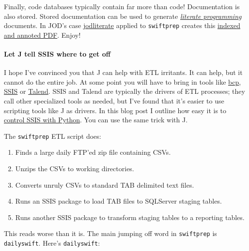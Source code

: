     Finally, code databases typically contain far more than code!
Documentation is also stored. Stored documentation can be used to
generate
\href{https://en.wikipedia.org/wiki/Literate_programming}{\emph{literate
programming}} documents. In JOD's case
\href{https://analyzethedatanotthedrivel.org/2020/05/25/using-jodliterate/}{jodliterate}
applied to \texttt{swiftprep} creates this
\href{https://bakerjd99.files.wordpress.com/2021/08/swiftprep.pdf}{indexed
and annoted PDF}. Enjoy!

    \hypertarget{let-j-tell-ssis-where-to-get-off}{%
\paragraph{Let J tell SSIS where to get
off}\label{let-j-tell-ssis-where-to-get-off}}

I hope I've convinced you that J can help with ETL irritants. It can
help, but it cannot do the entire job. At some point you will have to
bring in tools like
\href{https://docs.microsoft.com/en-us/sql/tools/bcp-utility?view=sql-server-ver15}{bcp},
\href{https://docs.microsoft.com/en-us/sql/integration-services/sql-server-integration-services?view=sql-server-ver15}{SSIS}
or \href{https://www.talend.com/}{Talend}. SSIS and Talend are typically
the drivers of ETL processes; they call other specialized tools as
needed, but I've found that it's easier to use scripting tools like J as
drivers. In this blog post I outline how easy it is to
\href{https://analyzethedatanotthedrivel.org/2021/06/05/running-ssis-packages-with-python/}{control
SSIS with Python}. You can use the same trick with J.

    The \texttt{swiftprep} ETL script does:

\begin{enumerate}
\def\labelenumi{\arabic{enumi}.}
\tightlist
\item
  Finds a large daily FTP'ed zip file containing CSVs.
\item
  Unzips the CSVs to working directories.
\item
  Converts unruly CSVs to standard TAB delimited text files.
\item
  Runs an SSIS package to load TAB files to SQLServer staging tables.
\item
  Runs another SSIS package to transform staging tables to a reporting
  tables.
\end{enumerate}

    This reads worse than it is. The main jumping off word in
\texttt{swiftprep} is \texttt{dailyswift}. Here's \texttt{dailyswift}:

